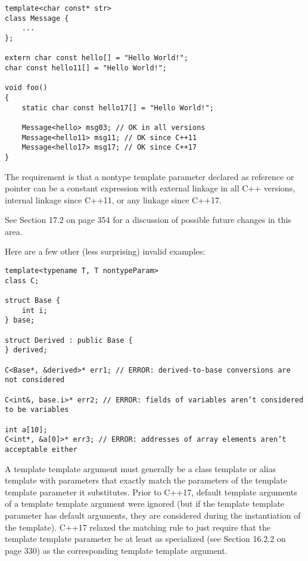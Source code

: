 \begin{lstlisting}[style=styleCXX]
template<char const* str>
class Message {
	...
};

extern char const hello[] = "Hello World!";
char const hello11[] = "Hello World!";

void foo()
{
	static char const hello17[] = "Hello World!";
	
	Message<hello> msg03; // OK in all versions
	Message<hello11> msg11; // OK since C++11
	Message<hello17> msg17; // OK since C++17
}
\end{lstlisting}

The requirement is that a nontype template parameter declared as reference or pointer can be a constant expression with external linkage in all C++ versions, internal linkage since C++11, or any linkage since C++17.

See Section 17.2 on page 354 for a discussion of possible future changes in this area.

Here are a few other (less surprising) invalid examples:

\begin{lstlisting}[style=styleCXX]
template<typename T, T nontypeParam>
class C;

struct Base {
	int i;
} base;

struct Derived : public Base {
} derived;

C<Base*, &derived>* err1; // ERROR: derived-to-base conversions are not considered

C<int&, base.i>* err2; // ERROR: fields of variables aren’t considered to be variables

int a[10];
C<int*, &a[0]>* err3; // ERROR: addresses of array elements aren’t acceptable either
\end{lstlisting}



A template template argument must generally be a class template or alias template with parameters that exactly match the parameters of the template template parameter it substitutes. Prior to C++17, default template arguments of a template template argument were ignored (but if the template template parameter has default arguments, they are considered during the instantiation of the template). C++17 relaxed the matching rule to just require that the template template parameter be at least as specialized (see Section 16.2.2 on page 330) as the  corresponding template template argument.

